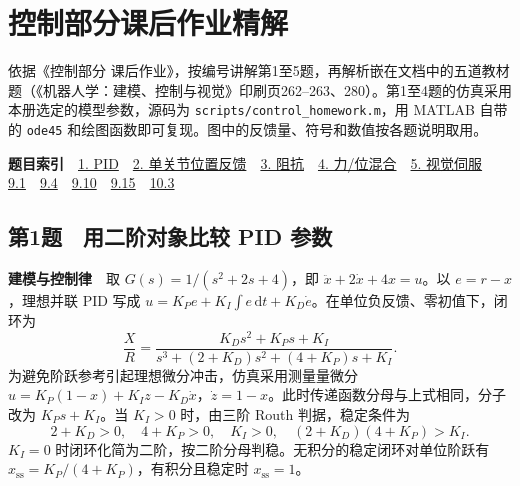 \chapter*{控制部分课后作业精解}
{}
\label{hw:robot-control}

依据《控制部分 课后作业》，按编号讲解第1至5题，再解析嵌在文档中的五道教材题（《机器人学：建模、控制与视觉》印刷页262--263、280）。第1至4题的仿真采用本册选定的模型参数，源码为 \texttt{scripts/control\_homework.m}，用 MATLAB 自带的 \texttt{ode45} 和绘图函数即可复现。图中的反馈量、符号和数值按各题说明取用。

\noindent\textbf{题目索引}　\hyperref[hw:control-1]{1. PID}　\hyperref[hw:control-2]{2. 单关节位置反馈}　\hyperref[hw:control-3]{3. 阻抗}　\hyperref[hw:control-4]{4. 力/位混合}　\hyperref[hw:control-5]{5. 视觉伺服}\\
\hyperref[hw:control-9-1]{9.1}　\hyperref[hw:control-9-4]{9.4}　\hyperref[hw:control-9-10]{9.10}　\hyperref[hw:control-9-15]{9.15}　\hyperref[hw:control-10-3]{10.3}

\section*{第1题　用二阶对象比较 PID 参数}
\label{hw:control-1}
\textbf{建模与控制律}　取 $G(s)=1/(s^2+2s+4)$，即 $\ddot x+2\dot x+4x=u$。以 $e=r-x$，理想并联 PID 写成 $u=K_Pe+K_I\int e\,\mathrm dt+K_D\dot e$。在单位负反馈、零初值下，闭环为
\[
  \frac{X}{R}=\frac{K_Ds^2+K_Ps+K_I}{s^3+(2+K_D)s^2+(4+K_P)s+K_I}.
\]
为避免阶跃参考引起理想微分冲击，仿真采用测量量微分 $u=K_P(1-x)+K_I z-K_D\dot x$，$\dot z=1-x$。此时传递函数分母与上式相同，分子改为 $K_Ps+K_I$。当 $K_I>0$ 时，由三阶 Routh 判据，稳定条件为
\[
  2+K_D>0,\quad 4+K_P>0,\quad K_I>0,\quad (2+K_D)(4+K_P)>K_I.
\]
$K_I=0$ 时闭环化简为二阶，按二阶分母判稳。无积分的稳定闭环对单位阶跃有 $x_{\mathrm{ss}}=K_P/(4+K_P)$，有积分且稳定时 $x_{\mathrm{ss}}=1$。

